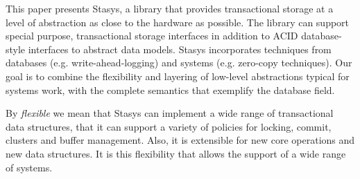 \documentclass[letterpaper,twocolumn,10pt]{article}
\newcommand{\yad}{Stasys\xspace}
\newcommand{\eat}[1]{}
\begin{document}
\eat{
Examples of real world systems that currently fall into this category
are web search engines, document repositories, large-scale web-email
services, map and trip planning services, ticket reservation systems,
photo and video repositories, bioinformatics, version control systems,
workflow applications, CAD/VLSI applications and directory services.

In short, we believe that a fundamental architectural shift in
transactional storage is necessary before general purpose storage
systems are of practical use to modern applications.
Until this change occurs, databases' imposition of unwanted
abstraction upon their users will restrict system designs and
implementations.
}

%


This paper presents \yad, a library that provides transactional
storage at a level of abstraction as close to the hardware as
possible.  The library can support special purpose, transactional
storage interfaces in addition to ACID database-style interfaces to
abstract data models.  \yad incorporates techniques from databases
(e.g. write-ahead-logging) and systems (e.g. zero-copy techniques).
Our goal is to combine the flexibility and layering of low-level
abstractions typical for systems work, with the complete semantics
that exemplify the database field.

By {\em flexible} we mean that \yad{}  can implement a wide
range of transactional data structures, that it can support a variety
of policies for locking, commit, clusters and buffer management.
Also, it is extensible for new core operations
and new data structures. It is this flexibility that allows the
support of a wide range of systems.
\end{document}
